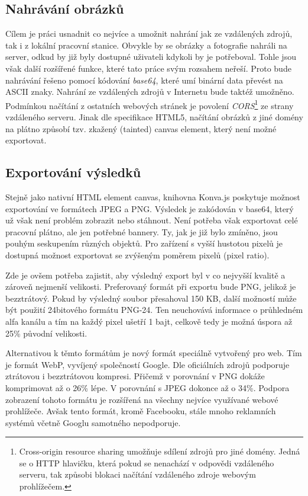         \subsection{Nahrávání obrázků}
        Cílem je práci usnadnit co nejvíce a umožnit nahrání jak ze vzdálených zdrojů, tak i z lokální pracovní stanice.
        Obvykle by se obrázky a fotografie nahráli na server, odkud by již byly dostupné uživateli kdykoli by je potřeboval.
        Tohle jsou však další rozšířené funkce, které tato práce svým rozsahem neřeší. Proto bude nahrávání řešeno pomocí kódování \emph{base64},
        které umí binární data převést na ASCII znaky. Nahrání ze vzdálených zdrojů v Internetu bude taktéž umožněno. Podmínkou načítání z ostatních webových stránek
        je povolení \emph{CORS}\footnote{Cross-origin resource sharing umožňuje sdílení zdrojů pro jiné domény. Jedná se o HTTP hlavičku, která pokud se nenachází v odpovědi vzdáleného serveru, tak způsobi blokaci načítání vzdáleného zdroje webovým prohlížečem.} ze strany vzdáleného serveru. Jinak dle specifikace HTML5, načítání obrázků z jiné domény na plátno 
        způsobí tzv. zkažený (tainted) canvas element, který není možné exportovat.

        \subsection{Exportování výsledků}
        Stejně jako nativní HTML element canvas, knihovna Konva.js poskytuje možnost exportování ve formátech JPEG a PNG.
        Výsledek je zakódován v base64, který už však není problém zobrazit nebo stáhnout.
        Není potřeba však exportovat celé pracovní plátno, ale jen potřebné bannery. Ty, jak je již bylo zmíněno,
        jsou pouhým seskupením různých objektů. Pro zařízení s vyšší hustotou pixelů je dostupná možnost exportovat se zvýšeným poměrem pixelů (pixel ratio). 

        Zde je ovšem potřeba zajistit, aby výsledný export byl v co nejvyšší kvalitě a zároveň nejmenší velikosti.
        Preferovaný formát při exportu bude PNG, jelikož je bezztrátový. Pokud by výsledný soubor přesahoval 150 KB,
        další možností může být použití 24bitového formátu PNG-24.
        Ten neuchovává informace o průhledném alfa kanálu a tím na každý pixel ušetří 1 bajt, celkově tedy je možná úspora až 25\% původní velikosti. 

        Alternativou k těmto formátům je nový formát speciálně vytvořený pro web. Tím je formát WebP, vyvíjený společností Google.
        Dle oficiálních zdrojů podporuje ztrátovou i bezztrátovou kompresi. Přičemž v porovnání v PNG dokáže komprimovat až o 26\% lépe. V porovnání
        s JPEG dokonce až o 34\%. Podpora zobrazení tohoto formátu je rozšířená na všechny nejvíce využívané webové prohlížeče.
        Avšak tento formát, kromě Facebooku, stále mnoho reklamních systémů včetně Googlu samotného nepodporuje.

